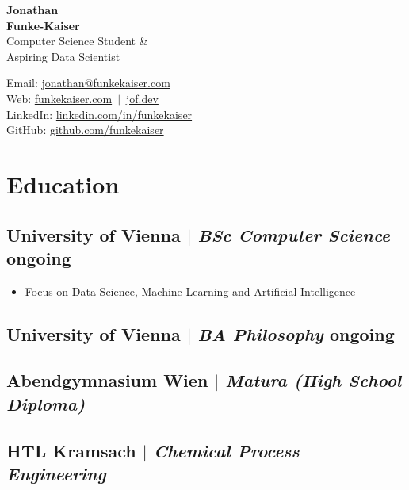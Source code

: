 \documentclass[11pt]{article}
\begin{document}
\begin{center}
	\begin{minipage}{0.5\textwidth}
		{\Huge\bfseries Jonathan \\[2pt] Funke-Kaiser} \\[2pt]
		Computer Science Student \& \\
		Aspiring Data Scientist
	\end{minipage} \hfill
	\begin{minipage}{0.45\textwidth}
		\raggedleft
		Email: \href{mailto:jonathan@funkekaiser.com}{jonathan@funkekaiser.com} \\
		Web: \href{https://funkekaiser.com}{funkekaiser.com} $\,|\,$ \href{https://jof.dev}{jof.dev} \\
		LinkedIn: \href{https://linkedin.com/in/funkekaiser}{linkedin.com/in/funkekaiser} \\
		GitHub: \href{https://github.com/funkekaiser}{github.com/funkekaiser}
	\end{minipage}
\end{center}

\section{Education}
\subsection{University of Vienna $|$ {\normalfont\itshape BSc Computer Science} \hfill ongoing}
\begin{itemize}
	\item Focus on Data Science, Machine Learning and Artificial Intelligence
\end{itemize}
\vspace{-8pt}
\subsection{University of Vienna $|$ {\normalfont\itshape BA Philosophy} \hfill ongoing}
\vspace{12pt}
\subsection{Abendgymnasium Wien $|$ {\normalfont\itshape Matura (High School Diploma)}}
\subsection{HTL Kramsach $|$ {\normalfont\itshape Chemical Process Engineering}}
\vspace{12pt}
\end{document}
